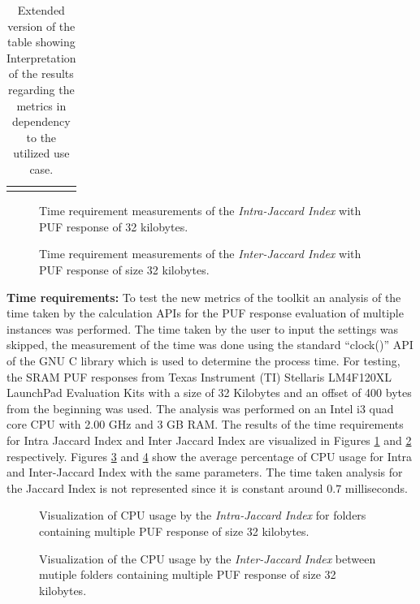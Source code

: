 \begin{table}[]
\begin{tabular}{@{}lccccc@{}}
\addlinespace
\bottomrule
\end{tabular}
\caption{Extended version of the table showing Interpretation of the results regarding the metrics in dependency to the utilized use case.}
\label{tab:metrics}
\end{table}

\begin{figure}
\centering
{}
\caption{Time requirement measurements of the \emph{Intra-Jaccard Index} with PUF response of 32 kilobytes.}
\label{img:time_intra}
\end{figure}

\begin{figure}
\centering
{}
\caption{Time requirement measurements of the \emph{Inter-Jaccard Index} with PUF response of size 32 kilobytes.}
\label{img:time_inter}
\end{figure}

\textbf{Time requirements:} To test the new metrics of the toolkit an analysis of the time taken by the calculation APIs for the PUF response evaluation of multiple instances was performed. The time taken by the user to input the settings was skipped, the measurement of the time was done using the standard ``clock()'' API of the GNU C library which is used to determine the process time. For testing, the SRAM PUF responses from Texas Instrument (TI) Stellaris LM4F120XL LaunchPad Evaluation Kits with a
size of 32 Kilobytes and an offset of 400 bytes from the beginning was used. The analysis was performed on an Intel i3 quad core CPU with 2.00 GHz and 3 GB RAM. The results of the time requirements for Intra Jaccard Index and Inter Jaccard Index are visualized in Figures \ref{img:time_intra} and \ref{img:time_inter} respectively. Figures \ref{img:cpu_intra} and \ref{img:cpu_inter} show the average percentage of CPU usage for Intra and Inter-Jaccard Index with the same parameters. The time taken analysis for the Jaccard Index is not represented since it is constant around $0.7$ milliseconds.

\begin{figure}
\centering
{}
\caption{Visualization of CPU usage by the \emph{Intra-Jaccard Index} for folders containing multiple PUF response of size 32 kilobytes.}
\label{img:cpu_intra}
\end{figure}

\begin{figure}
\centering
{}
\caption{Visualization of the CPU usage by the \emph{Inter-Jaccard Index} between mutiple folders containing multiple PUF response of size 32 kilobytes.}
\label{img:cpu_inter}
\end{figure}

